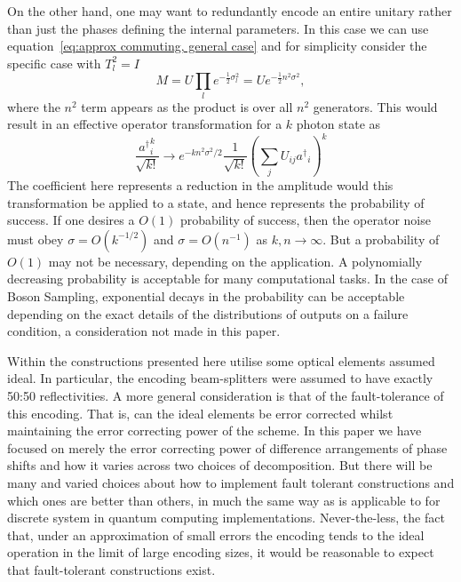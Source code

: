 \documentclass[aps,pra,twocolumn,superscriptaddress,numerical,floatfix]{revtex4-1}
\begin{document}
On the other hand, one may want to redundantly encode an entire unitary rather than just the phases defining the internal parameters.  In this case we can use equation~\ref{eq:approx commuting, general case} and for simplicity consider the specific case with $T_l^2= I$
\begin{equation}
	M = U \prod_l e^{-\frac{1}{2}\sigma_l^2} = U e^{-\frac{1}{2} n^2 \sigma^2},
\end{equation}
where the $n^2$ term appears as the product is over all $n^2$ generators.
This would result in an effective operator transformation for a $k$ photon state as
\begin{equation}
	\frac{{a^\dagger}_i^{k}}{\sqrt{k!}} \rightarrow 
	e^{-k n^2 \sigma^2/2} \frac{1}{\sqrt{k!}} \left(\sum_j U_{ij} {a^\dagger}_i \right)^k
\end{equation}
The coefficient here represents a reduction in the amplitude would this transformation be applied to a state, and hence represents the probability of success. If one desires a $O(1)$ probability of success, then the operator noise must obey $\sigma = O(k^{-1/2})$ and $\sigma = O(n^{-1})$ as $k,n \rightarrow \infty$.   But a probability of $O(1)$ may not be necessary, depending on the application.  A polynomially decreasing probability is acceptable for many computational tasks. In the case of Boson Sampling, exponential decays in the probability can be acceptable depending on the exact details of the distributions of outputs on a failure condition, a consideration not made in this paper.

Within the constructions presented here utilise some optical elements assumed ideal.  In particular, the encoding beam-splitters were assumed to have exactly 50:50 reflectivities.  A more general consideration is that of the fault-tolerance of this encoding.  That is, can the ideal elements be error corrected whilst maintaining the error correcting power of the scheme.   In this paper we have focused on merely the error correcting power of difference arrangements of phase shifts and how it varies across two choices of decomposition.  But there will be many and varied choices about how to implement fault tolerant constructions and which ones are better than others, in much the same way as is applicable to for discrete system in quantum computing implementations.  Never-the-less, the fact that, under an approximation of small errors the encoding tends to the ideal operation in the limit of large encoding sizes, it would be reasonable to expect that fault-tolerant constructions exist.  
\end{document}
